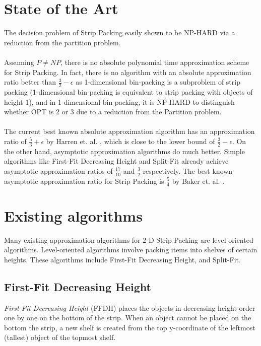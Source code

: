 \documentclass{article}
\begin{document}
\section{State of the Art}
The decision problem of Strip Packing easily shown to be NP-HARD via a reduction from the partition problem.\\
\\
Assuming $P \neq NP$, there is no absolute polynomial time approximation scheme for Strip Packing. In fact, there is no algorithm with an absolute approximation ratio better than $\frac{3}{2} - \epsilon$ as 1-dimensional bin-packing is a subproblem of strip packing (1-dimensional bin packing is equivalent to strip packing with objects of height $1$), and in 1-dimensional bin packing, it is NP-HARD to distinguish whether OPT is $2$ or $3$ due to a reduction from the Partition problem.\\
\\
The current best known absolute approximation algorithm has an approximation ratio of $\frac{5}{3} + \epsilon$ by Harren et. al. \cite{harren1}, which is close to the lower bound of $\frac{3}{2} - \epsilon$. On the other hand, asymptotic approximation algorithms do much better. Simple algorithms like First-Fit Decreasing Height and Split-Fit already achieve asymptotic approximation ratios of $\frac{17}{10}$ and $\frac{3}{2}$ respectively. The best known asymptotic approximation ratio for Strip Packing is $\frac{5}{4}$ by Baker et. al.  \cite{baker1}.\\

\section{Existing algorithms}
Many existing approximation algorithms for 2-D Strip Packing are level-oriented algorithms. Level-oriented algorithms involve packing items into shelves of certain heights. These algorithms include First-Fit Decreasing Height, and Split-Fit.
\subsection{First-Fit Decreasing Height}
\textit{First-Fit Decreasing Height} (FFDH) places the objects in decreasing height order one by one on the bottom of the strip. When an object cannot be placed on the bottom the strip, a new shelf is created from the top y-coordinate of the leftmost (tallest) object of the topmost shelf.\\
\end{document}
